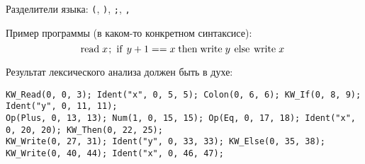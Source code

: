 \documentclass{article}
\newcommand{\llang}[1]{\mbox{\lstinline[mathescape]|#1|}}
\begin{document}
Разделители языка: \verb!(!, \verb!)!, \verb!;!, \verb!,! 

Пример программы (в каком-то конкретном синтаксисе): 
$$
\llang{read}\; x \llang{;} \; \llang{if} \; y + 1 == x  \; \llang{then} \; \llang{write} \; y \; \llang{else} \; \llang{write} \; x \;  
$$

Результат лексического анализа должен быть в духе: 

\begin{verbatim}
KW_Read(0, 0, 3); Ident("x", 0, 5, 5); Colon(0, 6, 6); KW_If(0, 8, 9); Ident("y", 0, 11, 11);
Op(Plus, 0, 13, 13); Num(1, 0, 15, 15); Op(Eq, 0, 17, 18); Ident("x", 0, 20, 20); KW_Then(0, 22, 25); 
KW_Write(0, 27, 31); Ident("y", 0, 33, 33); KW_Else(0, 35, 38); KW_Write(0, 40, 44); Ident("x", 0, 46, 47);
\end{verbatim}
\end{document}
